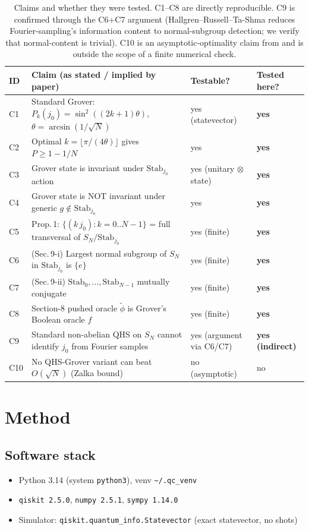\documentclass[11pt]{article}
\begin{document}
\begin{table}[h!]
\centering
\small
\begin{tabular}{@{}llll@{}}
\toprule
ID & Claim (as stated / implied by paper) & Testable? & Tested here? \\
\midrule
C1 & Standard Grover: $P_k(j_0)=\sin^{2}((2k{+}1)\theta)$, $\theta=\arcsin(1/\sqrt N)$ & yes (statevector) & \textbf{yes} \\
C2 & Optimal $k=\lfloor \pi/(4\theta)\rfloor$ gives $P\ge 1-1/N$ & yes & \textbf{yes} \\
C3 & Grover state is invariant under $\mathrm{Stab}_{j_0}$ action & yes (unitary $\otimes$ state) & \textbf{yes} \\
C4 & Grover state is NOT invariant under generic $g\notin\mathrm{Stab}_{j_0}$ & yes & \textbf{yes} \\
C5 & Prop.\,1: $\{(k\,j_0):k=0..N{-}1\}$ = full transversal of $S_N/\mathrm{Stab}_{j_0}$ & yes (finite) & \textbf{yes} \\
C6 & (Sec.\,9-i) Largest normal subgroup of $S_N$ in $\mathrm{Stab}_{j_0}$ is $\{e\}$ & yes (finite) & \textbf{yes} \\
C7 & (Sec.\,9-ii) $\mathrm{Stab}_{0},\dots,\mathrm{Stab}_{N-1}$ mutually conjugate & yes (finite) & \textbf{yes} \\
C8 & Section-8 pushed oracle $\widetilde\phi$ is Grover's Boolean oracle $f$ & yes (finite) & \textbf{yes} \\
C9 & Standard non-abelian QHS on $S_N$ cannot identify $j_0$ from Fourier samples & yes (argument via C6/C7) & \textbf{yes (indirect)} \\
C10 & No QHS-Grover variant can beat $O(\sqrt N)$ (Zalka bound) & no (asymptotic) & no \\
\bottomrule
\end{tabular}
\caption{Claims and whether they were tested. C1--C8 are directly reproducible.
C9 is confirmed through the C6+C7 argument (Hallgren--Russell--Ta-Shma reduces
Fourier-sampling's information content to normal-subgroup detection; we verify
that normal-content is trivial).  C10 is an asymptotic-optimality claim from
\cite{zalka} and is outside the scope of a finite numerical check.}
\end{table}

\section{Method}

\subsection{Software stack}
\begin{itemize}
\item Python 3.14 (system \texttt{python3}), venv \texttt{\~{}/.qc\_venv}
\item \texttt{qiskit 2.5.0}, \texttt{numpy 2.5.1}, \texttt{sympy 1.14.0}
\item Simulator: \texttt{qiskit.quantum\_info.Statevector} (exact statevector, no shots)
\end{itemize}
\end{document}
